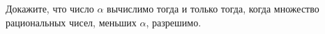Докажите, что число $\alpha$ вычислимо тогда и только тогда, когда множество рациональных чисел, меньших
$\alpha$, разрешимо.
